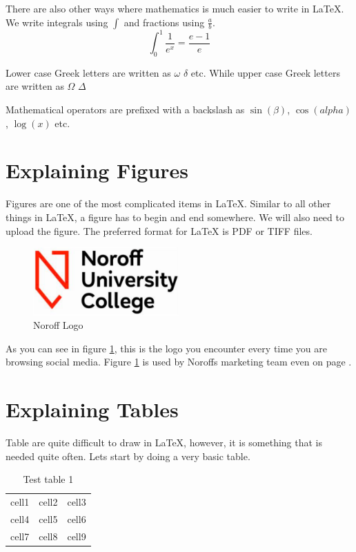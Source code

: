 \documentclass[a4paper, 10pt, english]{extarticle}
\begin{document}
\noindent
There are also other ways where mathematics is much easier to write in \LaTeX{}. We write integrals using $\int$ and fractions using $\frac{a}{b}$.
\begin{equation}
    \int_0^1 \frac{1}{e^x} = \frac{e-1}{e}
\end{equation}

Lower case Greek letters are written as $\omega$ $\delta$ etc. While upper case Greek letters are written as $\Omega$ $\Delta$

Mathematical operators are prefixed with a backslash as $\sin(\beta)$, $\cos(alpha)$, $\log(x)$ etc.

\section{Explaining Figures}
Figures are one of the most complicated items in \LaTeX{}. Similar to all other things in \LaTeX{}, a figure has to begin and end somewhere. We will also need to upload the figure. The preferred format for \LaTeX{} is PDF or TIFF files.

\begin{figure}[H]
    \centering
    \includegraphics[width=0.5\textwidth]{Noroff.pdf}
    \caption{Noroff Logo}
    \label{fig:noroff_logo}
\end{figure}

As you can see in figure \ref{fig:noroff_logo}, this is the logo you encounter every time you are browsing social media. Figure \ref{fig:noroff_logo} is used by Noroffs marketing team even on page \pageref{fig:noroff_logo}.

\section{Explaining Tables}
Table are quite difficult to draw in \LaTeX{}, however, it is something that is needed quite often. Lets start by doing a very basic table.

\begin{table}[H]
    \centering
    \begin{tabular}{c c c}
    cell1 & cell2 & cell3 \\
    cell4 & cell5 & cell6 \\
    cell7 & cell8 & cell9
    \end{tabular}
    \caption{Test table 1}
    \label{tab:test_table1}
\end{table}
\end{document}

